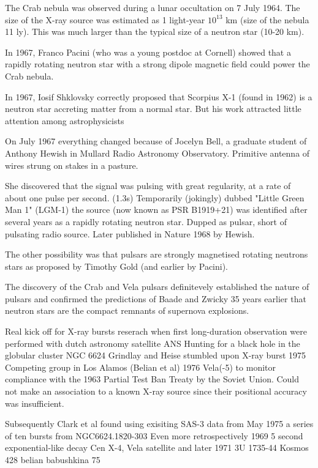 The Crab nebula was observed during a lunar occultation on 7 July 1964. 
The size of the X-ray source was estimated as 1 light-year $10^{13}$ km (size of the nebula 11 ly). 
This was much larger than the typical size of a neutron star (10-20 km).

In 1967, Franco Pacini (who was a young postdoc at Cornell) showed that a rapidly rotating neutron star with a strong dipole magnetic field could power the Crab nebula.

In 1967, Iosif Shklovsky correctly proposed that Scorpius X-1 (found in 1962) is a neutron star accreting matter from a normal star. \cite{Shklovsky67}
But his work attracted little attention among astrophysicists

On July 1967 everything changed because of Jocelyn Bell, a graduate student of Anthony Hewish in Mullard Radio Astronomy Observatory.
Primitive antenna of wires strung on stakes in a pasture.

She discovered that the signal was pulsing with great regularity, at a rate of about one pulse per second. (1.3s)
Temporarily (jokingly) dubbed "Little Green Man 1" (LGM-1) the source (now known as PSR B1919+21) was identified after several years as a rapidly rotating neutron star.
Dupped as pulsar, short of pulsating radio source.
Later published in Nature 1968 by Hewish. \cite{Hewish68}


The other possibility was that pulsars are strongly magnetised rotating neutrons stars as proposed by Timothy Gold (and earlier by Pacini).
\cite{Gold68}

The discovery of the Crab and Vela pulsars definitevely established the nature of pulsars and confirmed the predictions of Baade and Zwicky 35 years earlier that neutron stars are the compact remnants of supernova explosions.


Real kick off for X-ray bursts reserach when first long-duration observation were performed with dutch astronomy satellite ANS
Hunting for a black hole in the globular cluster NGC 6624 Grindlay and Heise stumbled upon X-ray burst 1975 \cite{GH75} \cite{GGS76}
Competing group in Los Alamos (Belian et al) 1976\cite{BCE76}
Vela(-5) to monitor compliance with the 1963 Partial Test Ban Treaty by the Soviet Union. Could not make an association to a known X-ray source since their positional accuracy was insufficient.


Subsequently Clark et al found using exisiting SAS-3 data from May 1975 a series of ten bursts from NGC6624.1820-303 \cite{CJB76}
Even more retrospectively
1969 \cite{BCE72} 5 second exponential-like decay Cen X-4, Vela satellite  and later 1971 \cite{BKM75} 3U 1735-44 Kosmos 428  
belian \cite{BCE72}
babushkina 75\cite{BKM75}

